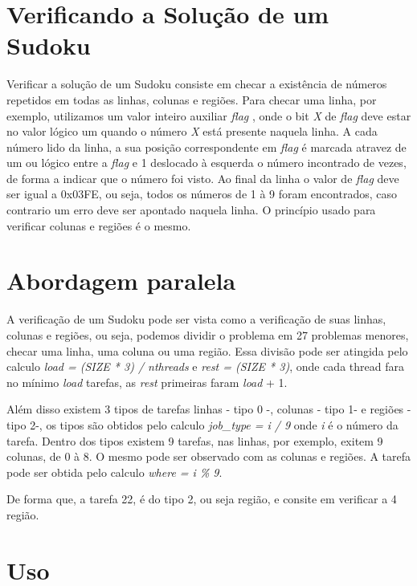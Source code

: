 \documentclass[a4paper, 12pt]{article}
\begin{document}
\section{Verificando a Solução de um Sudoku}

Verificar a solução de um Sudoku consiste em checar a existência de números
repetidos em todas as linhas, colunas e regiões. Para checar uma linha,
por exemplo, utilizamos um valor inteiro auxiliar \textit{flag} , onde o bit
\textit{X} de \textit{flag} deve estar no valor lógico um quando o número \textit{X}
está presente naquela linha.
A cada número lido da linha, a sua posição correspondente em \textit{flag} é
marcada atravez de um ou lógico entre a \textit{flag} e 1 deslocado à esquerda
o número incontrado de vezes, de forma a indicar que o número foi visto.
Ao final da linha o valor de \textit{flag} deve ser igual a 0x03FE, ou seja,
 todos os números de 1 à 9 foram encontrados, caso contrario um erro deve ser
apontado naquela linha. O princípio usado para verificar colunas e regiões é
o mesmo.


\section{Abordagem paralela}
A verificação de um Sudoku pode ser vista como a verificação de suas linhas,
colunas e regiões, ou seja, podemos dividir o problema em 27 problemas menores,
checar uma linha, uma coluna ou uma região.
Essa divisão pode ser atingida pelo calculo \textit{load = (SIZE * 3) / nthreads} e
\textit{rest = (SIZE * 3)}, onde cada thread fara no mínimo \textit{load} tarefas,
as \textit{rest} primeiras faram \textit{load} + 1.
\par
Além disso existem 3 tipos de tarefas linhas - tipo 0 -, colunas - tipo 1-  e
regiões - tipo 2-, os tipos são obtidos pelo calculo \textit{job\_type = i / 9}
onde \textit{i} é o número da tarefa. Dentro dos tipos existem 9 tarefas, nas
linhas, por exemplo, exitem 9 colunas, de 0 à 8. O mesmo pode ser observado com
as colunas e regiões. A tarefa pode ser obtida pelo calculo \textit{where = i \% 9}.
\par
De forma que, a tarefa 22, é do tipo 2, ou seja região, e consite em verificar
a 4 região.



\section{Uso}
\end{document}
